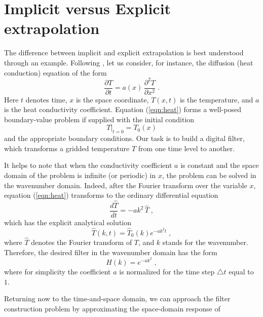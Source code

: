 \section{Implicit versus Explicit extrapolation}

The difference between implicit and explicit extrapolation is best
understood through an example. Following \cite{Claerbout.blackwell.85},
let us consider, for instance, the diffusion (heat conduction) equation
of the form
\begin{equation}
  {\frac{\partial T}{\partial t}} = {a (x)\,{\frac{\partial^2 T}{\partial x^2}}}\;.
\label{eqn:heat}
\end{equation}
Here $t$ denotes time, $x$ is the space coordinate, $T (x,t)$ is the
temperature, and $a$ is the heat conductivity coefficient.
Equation (\ref{eqn:heat}) forms a well-posed boundary-value problem if
supplied with the initial condition
\begin{equation}
  \label{eqn:heatinit}
  \left.T\right|_{t=0} = T_0 (x)
\end{equation}
and the appropriate boundary conditions. Our task is to build a
digital filter, which transforms a gridded temperature $T$ from one
time level to another.
\par
It helps to note that when the conductivity coefficient $a$ is
constant and the space domain of the problem is infinite (or periodic)
in $x$, the problem can be solved in the wavenumber domain. Indeed,
after the Fourier transform over the variable $x$, equation
(\ref{eqn:heat}) transforms to the ordinary differential equation
\begin{equation}
  {\frac{d \hat{T}}{d t}} = {- a k^2\, \hat{T}}\;,
  \label{eqn:heatk}	
\end{equation}
which has the explicit analytical solution
\begin{equation}
  \label{eqn:heatsol}
  \hat{T} (k,t) = \hat{T}_0 (k) e^{- a k^2 t}\;,
\end{equation}
where $\hat{T}$ denotes the Fourier transform of $T$, and $k$ stands
for the wavenumber. Therefore, the desired filter in the
wavenumber domain has the form
\begin{equation}
  \label{eqn:heatf}
  H (k) = e^{- a k^2}\;,
\end{equation}
where for simplicity the coefficient $a$ is normalized for the time
step $\triangle t$ equal to $1$.
\par
Returning now to the time-and-space domain, we can approach the filter
construction problem by approximating the space-domain response of
